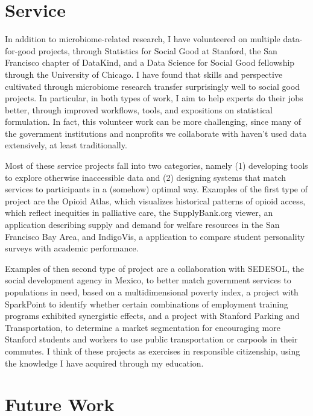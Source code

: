 \documentclass{article}
\begin{document}
\section{Service}

In addition to microbiome-related research, I have volunteered on multiple
data-for-good projects, through Statistics for Social Good at Stanford, the San
Francisco chapter of DataKind, and a Data Science for Social Good fellowship
through the University of Chicago. I have found that skills and perspective
cultivated through microbiome research transfer surprisingly well to social good
projects. In particular, in both types of work, I aim to help experts do their
jobs better, through improved workflows, tools, and expositions on statistical
formulation. In fact, this volunteer work can be more challenging, since many of
the government institutions and nonprofits we collaborate with haven't
used data extensively, at least traditionally.

Most of these service projects fall into two categories, namely (1) developing
tools to explore otherwise inaccessible data and (2) designing systems that
match services to participants in a (somehow) optimal way. Examples of the first
type of project are the Opioid Atlas, which visualizes historical patterns of
opioid access, which reflect inequities in palliative care, the SupplyBank.org
viewer, an application describing supply and demand for welfare resources in the
San Francisco Bay Area, and IndigoVis, a application to compare student
personality surveys with academic performance.

Examples of then second type of project are a collaboration with SEDESOL, the
social development agency in Mexico, to better match government services to
populations in need, based on a multidimensional poverty index, a project with
SparkPoint to identify whether certain combinations of employment training
programs exhibited synergistic effects, and a project with Stanford Parking and
Transportation, to determine a market segmentation for encouraging more Stanford
students and workers to use public transportation or carpools in their commutes.
I think of these projects as exercises in responsible citizenship, using the
knowledge I have acquired through my education.

\section{Future Work}
\end{document}
